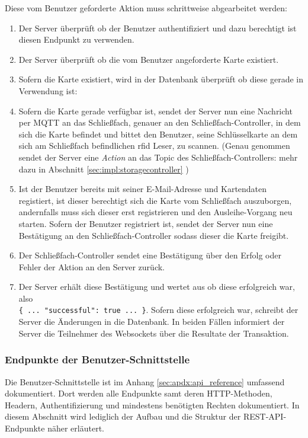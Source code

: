 \newpage
Diese vom Benutzer geforderte Aktion muss schrittweise abgearbeitet werden:
\begin{enumerate}[label=\textbf{Schritt (\roman*)}]\setlength\itemsep{1.5em}
\item Der Server überprüft ob der Benutzer authentifiziert und dazu berechtigt ist diesen Endpunkt zu verwenden. 
\item Der Server überprüft ob die vom Benutzer angeforderte Karte existiert.
\item  Sofern die Karte existiert, wird in der Datenbank überprüft ob diese gerade in Verwendung ist: 
\item Sofern die Karte gerade verfügbar ist, sendet der Server nun eine Nachricht per MQTT an das Schließfach, genauer an den Schließfach-Controller, in dem sich die Karte befindet und bittet den Benutzer, seine Schlüsselkarte an dem sich am Schließfach befindlichen \acrshort{rfid} Leser, zu scannen. (Genau 
genommen sendet der Server eine \textit{Action} an das Topic des Schließfach-Controllers: mehr dazu in Abschnitt \ref{sec:impl:storagecontroller} ) 
\item Ist der Benutzer bereits mit seiner E-Mail-Adresse und Kartendaten registiert, ist dieser berechtigt sich die Karte vom Schließfach auszuborgen, andernfalls muss sich dieser erst registrieren und den Ausleihe-Vorgang neu starten. Sofern der Benutzer registriert ist, sendet der Server nun eine Bestätigung an den Schließfach-Controller sodass dieser die Karte freigibt.
\item Der Schließfach-Controller sendet eine Bestätigung über den Erfolg oder Fehler der Aktion an den Server zurück.
\item Der Server erhält diese Bestätigung und wertet aus ob diese erfolgreich war, also\\ \verb|{ ... "successful": true ... }|. Sofern diese erfolgreich war, schreibt der Server die Änderungen in die Datenbank. In beiden Fällen informiert der Server die Teilnehmer des Websockets über die Resultate der Transaktion.
\end{enumerate}

\subsubsection{Endpunkte der Benutzer-Schnittstelle}
Die Benutzer-Schnittstelle ist im Anhang \ref{sec:apdx:api_reference} umfassend dokumentiert. Dort werden alle Endpunkte samt deren HTTP-Methoden, Headern, Authentifizierung und mindestens benötigten Rechten dokumentiert. In diesem Abschnitt wird lediglich der Aufbau und die Struktur der REST-API-Endpunkte näher erläutert.\bigskip

